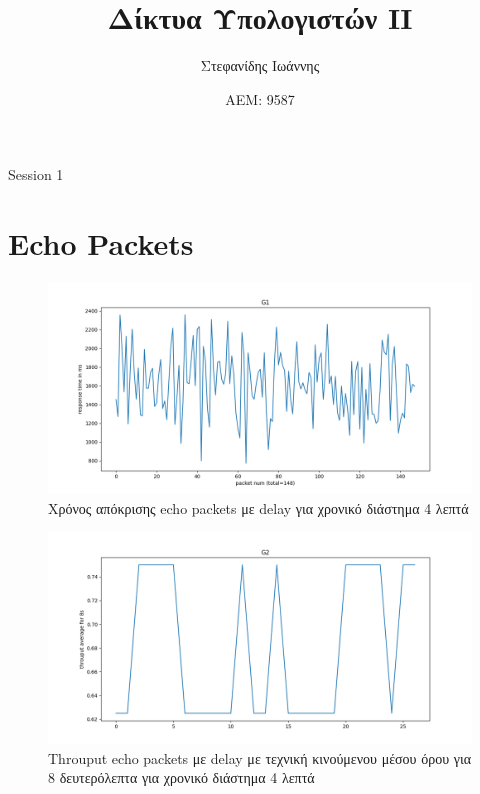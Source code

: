 \documentclass{article}
\author{Στεφανίδης Ιωάννης}
\title{Δίκτυα Υπολογιστών ΙΙ}
\date{ΑΕΜ: 9587}
\begin{document}
\maketitle

\begin{center}
  \huge Session 1
\end{center}

\section{Echo Packets}

\begin{figure}[H]
  \begin{center}
    \includegraphics[width=\textwidth]{G1.png}
  \end{center}
  \caption{Χρόνος απόκρισης echo packets με delay για χρονικό διάστημα 4 λεπτά}
\end{figure}

\begin{figure}[H]
  \begin{center}
    \includegraphics[width=\textwidth]{G2.png}
  \end{center}
  \caption{Throuput echo packets με delay με τεχνική κινούμενου μέσου όρου για 8
  δευτερόλεπτα για χρονικό διάστημα 4 λεπτά}
\end{figure}
\end{document}
